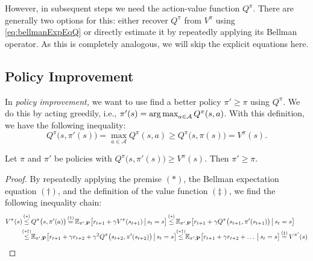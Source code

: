 			However, in subsequent steps we need the action-value function \(Q^\pi\). There are generally two options for this: either recover \(Q^\pi\) from \(V^\pi\) using \eqref{eq:bellmanExpEqQ} or directly estimate it by repeatedly applying its Bellman operator. As this is completely analogous, we will skip the explicit equations here.

		\subsection{Policy Improvement}
			In \emph{policy improvement,} we want to use find a better policy \(\pi' \geq \pi\) using \(Q^\pi\). We do this by acting greedily, i.e., \( \pi'(s) = \operatorname*{arg\,max}_{a \in \mathcal{A}} Q^\pi(s, a) \). With this definition, we have the following inequality:
			\begin{equation}
				Q^\pi\bigl( s, \pi'(s) \bigr)
					= \max_{a \in \mathcal{A}} Q^\pi(s, a)
					\geq Q^\pi\bigl( s, \pi(s) \bigr)
					= V^\pi(s).
			\end{equation}
			\begin{theorem}  \label{th:policyImprovement}
				Let \(\pi\) and \(\pi'\) be policies with \( Q^\pi\bigl( s, \pi'(s) \bigr) \geq V^\pi(s) \). Then \( \pi' \geq \pi \).
			\end{theorem}
			\begin{proof}
				By repeatedly applying the premise \((\ast)\), the Bellman expectation equation \((\dagger)\), and the definition of the value function \((\ddagger)\), we find the following inequality chain:
				\begin{align}
					V^\pi(s)
						&\overset{\mathclap{(\ast)}}{\leq} Q^\pi\bigl( s, \pi'(a) \bigr)
						 \overset{\mathclap{(\dagger)}}{=} \E_{\pi', \mat{P}}\bigl[ r_{t + 1} + \gamma V^\pi(s_{t + 1}) \biggiven s_t = s \bigr]
						 \overset{\mathclap{(\ast)}}{\leq} \E_{\pi', \mat{P}}\bigl[ r_{t + 1} + \gamma Q^\pi\bigl( s_{t + 1}, \pi'(s_{t + 1}) \bigr) \biggiven s_t = s \bigr] \\
						&\overset{\mathclap{(\ast\dagger)}}{\leq} \E_{\pi', \mat{P}}\bigl[ r_{t + 1} + \gamma r_{t + 2} + \gamma^2 Q^\pi\bigl( s_{t + 2}, \pi'(s_{t + 2}) \bigr) \biggiven s_t = s \bigr]
						 \overset{\mathclap{(\ast\dagger)}}{\leq} \E_{\pi', \mat{P}}\bigl[ r_{t + 1} + \gamma r_{t + 2} + \dots \biggiven s_t = s \bigr]
						 \overset{\mathclap{(\ddagger)}}{=} V^{\pi'}(s)
				\end{align}
			\end{proof}

